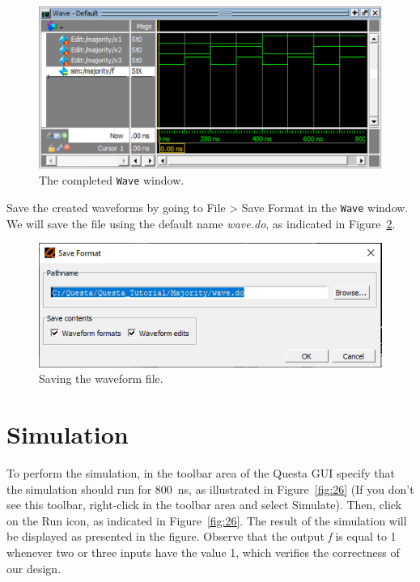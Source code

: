 \documentclass[11pt, twoside, pdftex]{article}
\begin{document}
\begin{figure}[H]
   \begin{center}
      \includegraphics[scale=0.75]{figures/complete_wave.png}
       \caption{The completed \texttt{Wave} window.} 
	 \label{fig:23}
	 \end{center}
\end{figure}

Save the created waveforms by going to {\sf File > Save Format} in the \texttt{Wave} window. 
We will save the file using the default name {\it wave.do}, as indicated in Figure~\ref{fig:24}.

\begin{figure}[H]
   \begin{center}
      \includegraphics[scale=0.75]{figures/figure24.png}
   \caption{Saving the waveform file.} 
	 \label{fig:24}
	 \end{center}
\end{figure}

\section{Simulation}

To perform the simulation, in the toolbar area of the Questa GUI specify that the simulation 
should run for 800~ns, as illustrated in Figure~\ref{fig:26} (If you don't see this toolbar, 
right-click in the toolbar area and select {\sf Simulate}). Then, click on the
{\sf Run} icon, as indicated in Figure~\ref{fig:26}. The result of the simulation will be 
displayed as presented in the figure. Observe that the output {\it f} is equal to 1 whenever 
two or three inputs have the value 1, which verifies the correctness of our design.
\end{document}
